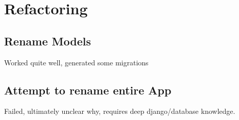 \section{Refactoring}

% 


\subsection{Rename Models}

\begin{frame}[c]
    Worked quite well, generated some migrations
\end{frame}

\subsection{Attempt to rename entire App}

\begin{frame}[c]
    Failed, ultimately unclear why, requires deep django/database knowledge.
\end{frame}
